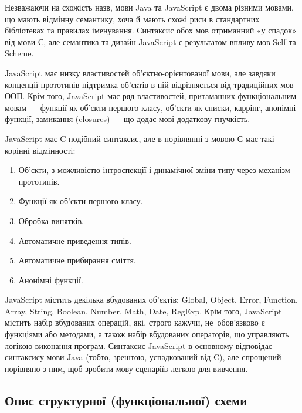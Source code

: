\documentclass[../main.tex]{subfiles}
\begin{document}
Незважаючи на схожість назв, мови Java та JavaScript є двома різними мовами, що мають відмінну семантику, хоча й мають схожі риси в стандартних бібліотеках та правилах іменування. Синтаксис обох мов отриманний «у спадок» від мови С, але семантика та дизайн JavaScript є результатом впливу мов Self та Scheme.

JavaScript має низку властивостей об'єктно-орієнтованої мови, але завдяки концепції прототипів підтримка об'єктів в ній відрізняється від традиційних мов ООП. Крім того, JavaScript має ряд властивостей, притаманних функціональним мовам — функції як об'єкти першого класу, об'єкти як списки, каррінг, анонімні функції, замикання (closures) — що додає мові додаткову гнучкість.

JavaScript має C-подібний синтаксис, але в порівнянні з мовою С має такі корінні відмінності:
\begin{enumerate}
	\item Об'єкти, з можливістю інтроспекції і динамічної зміни типу через механізм прототипів.
	\item Функції як об'єкти першого класу.
	\item Обробка винятків.
	\item Автоматичне приведення типів.
	\item Автоматичне прибирання сміття.
	\item Анонімні функції.
\end{enumerate}

JavaScript містить декілька вбудованих об'єктів: Global, Object, Error, Function, Array, String, Boolean, Number, Math, Date, RegExp. Крім того, JavaScript містить набір вбудованих операцій, які, строго кажучи, не~обов'язково є функціями або методами, а також набір вбудованих операторів, що управляють логікою виконання програм. Синтаксис JavaScript в основному відповідає синтаксису мови Java (тобто, зрештою, успадкований від C), але спрощений порівняно з ним, щоб зробити мову сценаріїв легкою для вивчення.

\subsection{Опис структурної (функціональної) схеми}
\end{document}
